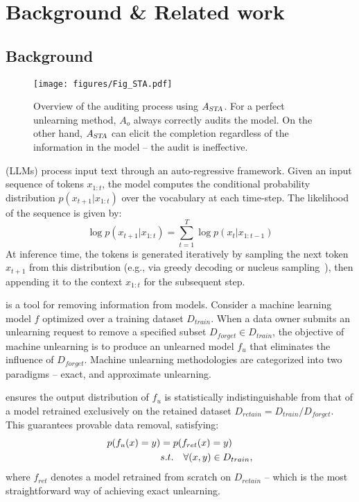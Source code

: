 \section{Background \& Related work}\label{sec:background}

\subsection{Background}

\begin{figure*}[ht!]
    \texttt{[image: figures/Fig\_STA.pdf]}
    \caption{Overview of the auditing process using $A_\textsl{STA}$. For a perfect unlearning method, $A_o$ always correctly audits the model. On the other hand, $A_\textsl{STA}$ can elicit the completion regardless of the information in the model -- the audit is ineffective.}
    \label{fig:auditor}
\end{figure*}
 (LLMs) process input text through an auto-regressive framework.
Given an input sequence of tokens $x_{1:t}$, the model computes the conditional probability distribution $p(x_{t+1}|x_{1:t})$ over the vocabulary at each time-step.
The likelihood of the sequence is given by:
\begin{equation}
    \log p(x_{t+1}|x_{1:t}) = \sum_{t=1}^T \log p(x_{t}|x_{1:t-1})
\end{equation}
At inference time, the tokens is generated iteratively by sampling the next token $x_{t+1}$ from this distribution (e.g., via greedy decoding or nucleus sampling~\cite{holtzman2019curious}), then appending it to the context $x_{1:t}$ for the subsequent step.

 is a tool for removing information from models.
Consider a machine learning model $f$ optimized over a training dataset $D_{train}$. 
When a data owner submits an unlearning request to remove a specified subset $D_{forget} \in D_{train}$, 
the objective of machine unlearning is to produce an unlearned model $f_{u}$ that eliminates the influence of $D_{forget}$.
Machine unlearning methodologies are categorized into two paradigms -- exact, and approximate unlearning.

 ensures the output distribution of $f_u$ is statistically indistinguishable from that of a model retrained exclusively on the retained dataset $D_{retain} = D_{train} / D_{forget}$.
This guarantees provable data removal, satisfying:
\begin{equation}
\centering
\begin{aligned}
    p(f_u(x) = y) & = p(f_{ret}(x) = y) \quad \\ 
    & s.t. \quad \forall(x,y) \in D_{train},
\end{aligned}
\end{equation}
where $f_{ret}$ denotes a model retrained from scratch on $D_{retain}$ -- which is the most straightforward way of achieving exact unlearning.

